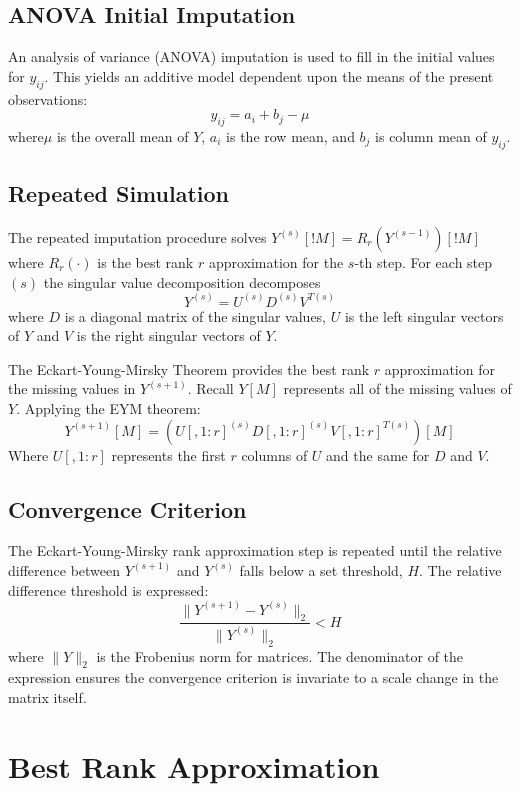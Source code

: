 \documentclass[12pt,twoside]{dukestatscithesis}
\theoremstyle{definition}
\theoremstyle{definition}
\theoremstyle{definition}
\theoremstyle{remark}
\begin{document}
\subsection{ANOVA Initial Imputation}\label{anova-initial-imputation}

An analysis of variance (ANOVA) imputation is used to fill in the
initial values for \(y_{ij}\). This yields an additive model dependent
upon the means of the present observations:
\[y_{ij} =  a_i + b_j - \mu\] where\(\mu\) is the overall mean of \(Y\),
\(a_i\) is the row mean, and \(b_j\) is column mean of \(y_{ij}\).

\subsection{Repeated Simulation}\label{repeated-simulation}

The repeated imputation procedure solves
\(Y^{(s)}[!M] = R_r(Y^{(s-1)})[!M]\) where \(R_r(\cdot)\) is the best
rank \(r\) approximation for the \(s\)-th step. For each step \((s)\)
the singular value decomposition decomposes
\[Y^{(s)} =  U^{(s)}D^{(s)}V^{T(s)}\] where \(D\) is a diagonal matrix
of the singular values, \(U\) is the left singular vectors of \(Y\) and
\(V\) is the right singular vectors of \(Y\).

The Eckart-Young-Mirsky Theorem provides the best rank \(r\)
approximation for the missing values in \(Y^{(s+1)}\). Recall \(Y[M]\)
represents all of the missing values of \(Y\). Applying the EYM theorem:
\[Y^{(s+1)}[M] = (U[,1:r]^{(s)}D[,1:r]^{(s)}V[,1:r]^{T(s)})[M]\] Where
\(U[,1:r]\) represents the first \(r\) columns of \(U\) and the same for
\(D\) and \(V\).

\subsection{Convergence Criterion}\label{convergence-criterion}

The Eckart-Young-Mirsky rank approximation step is repeated until the
relative difference between \(Y^{(s+1)}\) and \(Y^{(s)}\) falls below a
set threshold, \(H\). The relative difference threshold is expressed:
\[\frac{\|Y^{(s+1)}-Y^{(s)}\|_2}{\|Y^{(s)}\|_2} < H\] where \(\|Y\|_2\)
is the Frobenius norm for matrices. The denominator of the expression
ensures the convergence criterion is invariate to a scale change in the
matrix itself.

\section{Best Rank Approximation}\label{best-rank-approximation}
\end{document}
